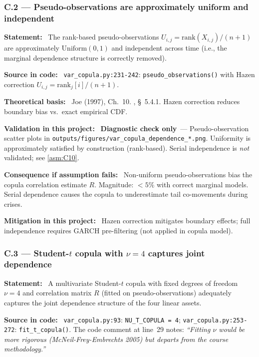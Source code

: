 \documentclass[11pt,a4paper]{article}
\newcommand{\asmfield}[1]{\medskip\noindent\textbf{#1:}\ }
\newcommand{\code}[1]{\texttt{#1}}
\newcommand{\diagnostic}{\textbf{Diagnostic check only}}
\begin{document}
\subsubsection{C.2 --- Pseudo-observations are approximately uniform and independent}\label{asm:C2}

\asmfield{Statement}
The rank-based pseudo-observations $U_{i,j} = \text{rank}(X_{i,j}) / (n+1)$
are approximately $\text{Uniform}(0,1)$ and independent across time
(i.e., the marginal dependence structure is correctly removed).

\asmfield{Source in code}
\code{var\_copula.py:231-242}: \code{pseudo\_observations()} with Hazen
correction $U_{i,j} = \text{rank}_j[i] / (n+1)$.

\asmfield{Theoretical basis}
Joe (1997), Ch.~10. \cite{McNeilFreyEmbrechts2005}, \S~5.4.1. Hazen
correction reduces boundary bias vs.\ exact empirical CDF.

\asmfield{Validation in this project}
\diagnostic\ --- Pseudo-observation scatter plots in
\code{outputs/figures/var\_copula\_dependence\_*.png}. Uniformity is
approximately satisfied by construction (rank-based). Serial independence
is \emph{not} validated; see \cref{asm:C10}.

\asmfield{Consequence if assumption fails}
Non-uniform pseudo-observations bias the copula correlation estimate $R$.
Magnitude: $< 5\%$ with correct marginal models. Serial dependence causes
the copula to underestimate tail co-movements during crises.

\asmfield{Mitigation in this project}
Hazen correction mitigates boundary effects; full independence requires
GARCH pre-filtering (not applied in copula model).

\subsubsection{C.3 --- Student-$t$ copula with $\nu = 4$ captures joint dependence}\label{asm:C3}

\asmfield{Statement}
A multivariate Student-$t$ copula with fixed degrees of freedom $\nu = 4$
and correlation matrix $R$ (fitted on pseudo-observations) adequately
captures the joint dependence structure of the four linear assets.

\asmfield{Source in code}
\code{var\_copula.py:93}: \lstinline|NU_T_COPULA = 4|;
\code{var\_copula.py:253-272}: \code{fit\_t\_copula()}.
The code comment at line~29 notes: \emph{``Fitting $\nu$ would be more
rigorous (McNeil-Frey-Embrechts 2005) but departs from the course
methodology.''}
\end{document}
